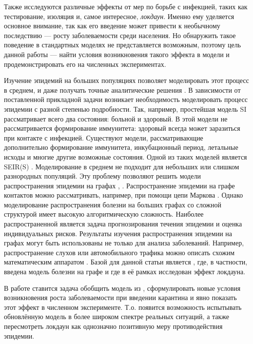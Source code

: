 	Также исследуются различные эффекты от мер по борьбе с инфекцией, таких как тестирование, изоляция и, самое интересное, \textit{локдаун}. Именно ему уделяется основное внимание, так как его введение может привести к необычному последствию --- росту заболеваемости среди населения. Но обнаружить такое поведение в стандартных моделях не представляется возможным, поэтому цель данной работы --- найти условия возникновения такого эффекта в модели и продемонстрировать его на численных экспериментах. 
	
	Изучение эпидемий на больших популяциях позволяет моделировать этот процесс в среднем, и даже получать точные аналитические решения \cite{harko2014exact}. В зависимости от поставленной прикладной задачи возникает необходимость моделировать процесс эпидемии с разной степенью подробности. Так, например, простейшая модель SI \cite{allen1994some} рассматривает всего два состояния: больной и здоровый. В этой модели не рассматривается формирование иммунитета: здоровый всегда может заразиться при контакте с инфекцией. Существуют модели, рассматривающие дополнительно формирование иммунитета, инкубационный период, летальные исходы и многие другие возможные состояния. Одной из таких моделей является SEIR(S) \cite{capasso2008mathematical}. Моделирование в среднем не подходит для небольших или слишком разнородных популяций. Эту проблему позволяют решить модели распространения эпидемии на графах \cite{moreno2002epidemic}, \cite{pastor2015epidemic}. Распространение эпидемии на графе контактов можно рассматривать, например, при помощи цепи Маркова \cite{gomez2010discrete}. Однако моделирование распространения болезни на больших графах со сложной структурой имеет высокую алгоритмическую сложность. Наиболее распространенной является задача прогнозирования течения эпидемии \cite{leitch2019toward} и оценка индивидуальных рисков. Результаты изучения распространения эпидемии на графах	могут быть использованы не только для анализа заболеваний. Например, распространение слухов или автомобильного трафика можно описать схожим математическим аппаратом \cite{de2013anatomy}. Базой для данной статьи является \cite{base_article}, где, в частности, введена модель болезни на графе и где в её рамках исследован эффект локдауна.
	
	В работе ставится задача обобщить модель из \cite{base_article}, сформулировать новые условия возникновения роста заболеваемости при введении карантина и явно показать этот эффект в численном эксперименте. Т.о. появится возможность испытывать обновлённую модель в более широком спектре реальных ситуаций, а также пересмотреть локдаун как однозначно позитивную меру противодействия эпидемии.
	
